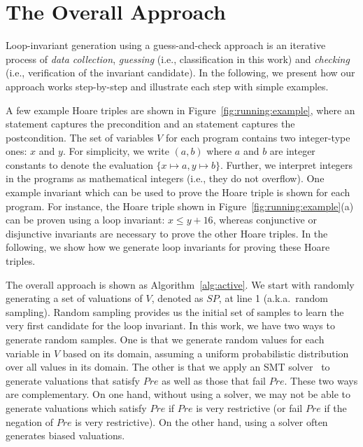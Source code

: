 \section{The Overall Approach}
\label{sec:overview}
Loop-invariant generation using a guess-and-check approach is an iterative process of \emph{data collection}, \emph{guessing} (i.e., classification in this work) and \emph{checking} (i.e., verification of the invariant candidate).
In the following, we present how our approach works step-by-step and illustrate each step with simple examples.

\begin{example}
A few example Hoare triples are shown in Figure~\ref{fig:running:example}, where an  statement captures the precondition and an  statement captures the postcondition.
The set of variables $V$ for each program contains two integer-type ones: $x$ and $y$. For simplicity, we write $(a, b)$ where $a$ and $b$ are integer constants to denote the  evaluation $\{x \mapsto a, y \mapsto b\}$. Further, we interpret integers in the programs as mathematical integers (i.e., they do not overflow).
One example invariant which can be used to prove the Hoare triple is shown for each program. For instance, the Hoare triple shown in Figure~\ref{fig:running:example}(a) can be proven using a loop invariant: $x \le y + 16$, whereas conjunctive or disjunctive invariants are necessary to prove the other Hoare triples. In the following, we show how we generate loop invariants for proving these Hoare triples.
\end{example}
\noindent The overall approach is shown as Algorithm~\ref{alg:active}. We start with randomly generating a set of valuations of $V$, denoted as $SP$, at line 1 (a.k.a.~random sampling). Random sampling provides us the initial set of samples to learn the very first candidate for the loop invariant.
In this work, we have two ways to generate random samples. One is that we generate random values for each variable in $V$ based on its domain,
assuming a uniform probabilistic distribution over all values in its domain.
The other is that we apply an SMT solver~\cite{barrett2009satisfiability,de2008z3} to generate valuations that satisfy $Pre$
as well as those that fail $Pre$. These two ways are complementary.
On one hand, without using a solver, we may not be able to generate valuations which satisfy $Pre$ if $Pre$ is very restrictive
(or fail $Pre$ if the negation of $Pre$ is very restrictive). On the other hand, using a solver often generates biased valuations. %

